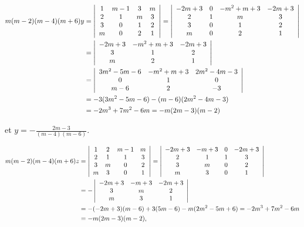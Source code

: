 {{\begin{align*}\ensuremath
m(m-2)(m-4)(m+6)y&=\left|
\begin{array}{cccc}
1&m-1&3&m\\
2&1&m&3\\
3&0&1&2\\
m&0&2&1
\end{array}\right|=\left|
\begin{array}{cccc}
-2m+3&0&-m^2+m+3&-2m+3\\
2&1&m&3\\
3&0&1&2\\
m&0&2&1
\end{array}\right|\\
 &=\left|
\begin{array}{ccc}
-2m+3&-m^2+m+3&-2m+3\\
3&1&2\\
m&2&1
\end{array}\right|\\
 &=\left|
\begin{array}{ccc}
3m^2-5m-6&-m^2+m+3&2m^2-4m-3\\
0&1&0\\
m-6&2&-3
\end{array}\right|\\
 &=-3(3m^2-5m-6)-(m-6)(2m^2-4m-3)\\
 &=-2m^3+7m^2-6m=-m(2m-3)(m-2)
\end{align*}

et $y=-\frac{2m-3}{(m-4)(m-6)}$.

\begin{align*}\ensuremath
m(m-2)(m-4)(m+6)z&=\left|
\begin{array}{cccc}
1&2&m-1&m\\
2&1&1&3\\
3&m&0&2\\
m&3&0&1
\end{array}\right|=\left|
\begin{array}{cccc}
-2m+3&-m+3&0&-2m+3\\
2&1&1&3\\
3&m&0&2\\
m&3&0&1
\end{array}\right|\\
 &=-\left|
\begin{array}{ccc}
-2m+3&-m+3&-2m+3\\
3&m&2\\
m&3&1
\end{array}\right|\\
 &=-(-2m+3)(m-6)+3(5m-6)-m(2m^2-5m+6)=-2m^3+7m^2-6m\\
 &=-m(2m-3)(m-2),
\end{align*}

}}
